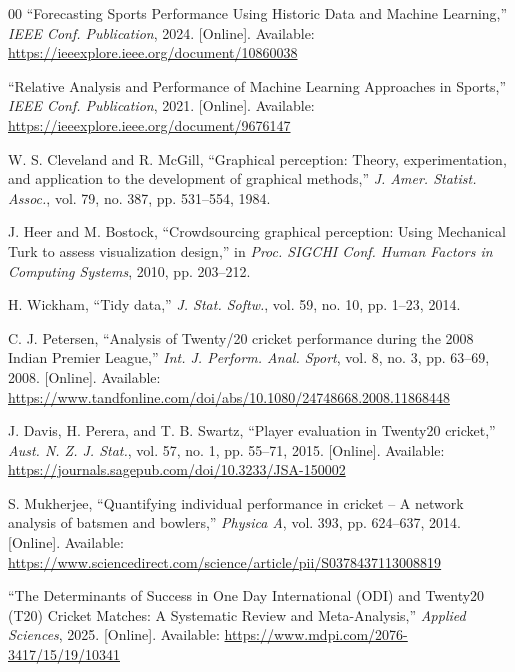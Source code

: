\documentclass[conference]{IEEEtran}
\begin{document}
\begin{thebibliography}{00}
``Forecasting Sports Performance Using Historic Data and Machine Learning,'' \textit{IEEE Conf. Publication}, 2024. [Online]. Available: \url{https://ieeexplore.ieee.org/document/10860038}

``Relative Analysis and Performance of Machine Learning Approaches in Sports,'' \textit{IEEE Conf. Publication}, 2021. [Online]. Available: \url{https://ieeexplore.ieee.org/document/9676147}

W. S. Cleveland and R. McGill, ``Graphical perception: Theory, experimentation, and application to the development of graphical methods,'' \textit{J. Amer. Statist. Assoc.}, vol. 79, no. 387, pp. 531--554, 1984.

J. Heer and M. Bostock, ``Crowdsourcing graphical perception: Using Mechanical Turk to assess visualization design,'' in \textit{Proc. SIGCHI Conf. Human Factors in Computing Systems}, 2010, pp. 203--212.

H. Wickham, ``Tidy data,'' \textit{J. Stat. Softw.}, vol. 59, no. 10, pp. 1--23, 2014.

C. J. Petersen, ``Analysis of Twenty/20 cricket performance during the 2008 Indian Premier League,'' \textit{Int. J. Perform. Anal. Sport}, vol. 8, no. 3, pp. 63--69, 2008. [Online]. Available: \url{https://www.tandfonline.com/doi/abs/10.1080/24748668.2008.11868448}

J. Davis, H. Perera, and T. B. Swartz, ``Player evaluation in Twenty20 cricket,'' \textit{Aust. N. Z. J. Stat.}, vol. 57, no. 1, pp. 55--71, 2015. [Online]. Available: \url{https://journals.sagepub.com/doi/10.3233/JSA-150002}

S. Mukherjee, ``Quantifying individual performance in cricket -- A network analysis of batsmen and bowlers,'' \textit{Physica A}, vol. 393, pp. 624--637, 2014. [Online]. Available: \url{https://www.sciencedirect.com/science/article/pii/S0378437113008819}

``The Determinants of Success in One Day International (ODI) and Twenty20 (T20) Cricket Matches: A Systematic Review and Meta-Analysis,'' \textit{Applied Sciences}, 2025. [Online]. Available: \url{https://www.mdpi.com/2076-3417/15/19/10341}

\end{thebibliography}
\end{document}
